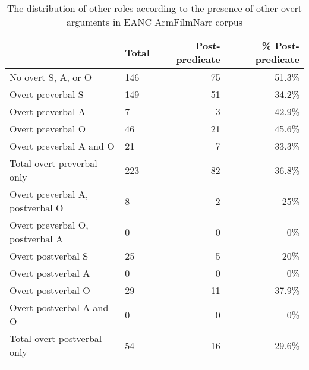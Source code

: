 \documentclass[output=paper,colorlinks,citecolor=brown,draftmode]{langscibook}
\begin{document}
\begin{table}
    \begin{tabularx}{\textwidth}{lYrr}
\lsptoprule
& Total & Post-predicate & \% Post-predicate \\
\midrule
No overt S, A, or O & 146 & 75 & 51.3\% \\
Overt preverbal S & 149 & 51 & 34.2\% \\
Overt preverbal A & 7 & 3 & 42.9\% \\
Overt preverbal O & 46 & 21 & 45.6\% \\
Overt preverbal A and O & 21 & 7 & 33.3\% \\
Total overt preverbal only & 223 & 82 & 36.8\% \\
Overt preverbal A, postverbal O & 8 & 2 & 25\% \\
Overt preverbal O, postverbal A & 0 & 0 & 0\% \\
Overt postverbal S & 25 & 5 & 20\% \\
Overt postverbal A & 0 & 0 & 0\% \\
Overt postverbal O & 29 & 11 & 37.9\% \\
Overt postverbal A and O & 0 & 0 & 0\% \\
Total overt postverbal only & 54 & 16 & 29.6\% \\
\lspbottomrule
    \end{tabularx}
    \caption{The distribution of other roles according to the presence of other overt arguments in EANC ArmFilmNarr corpus }
    \label{Armenian:tab:22}
\end{table}
\end{document}
